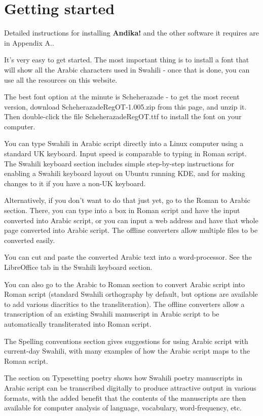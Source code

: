 \documentclass[a4paper,10pt, oneside]{book}
\begin{document}
\chapter{Getting started}

Detailed instructions for installing \textbf{Andika!} and the other software it requires are in Appendix A..

It's very easy to get started. The most important thing is to install a font that will show all the Arabic characters used in Swahili - once that is done, you can use all the resources on this website.

The best font option at the minute is Scheherazade - to get the most recent version, download ScheherazadeRegOT-1.005.zip from this page, and unzip it. Then double-click the file ScheherazadeRegOT.ttf to install the font on your computer.

You can type Swahili in Arabic script directly into a Linux computer using a standard UK keyboard. Input speed is comparable to typing in Roman script. The Swahili keyboard section includes simple step-by-step instructions for enabling a Swahili keyboard layout on Ubuntu running KDE, and for making changes to it if you have a non-UK keyboard.

Alternatively, if you don't want to do that just yet, go to the Roman to Arabic section. There, you can type into a box in Roman script and have the input converted into Arabic script, or you can input a web address and have that whole page converted into Arabic script. The offline converters allow multiple files to be converted easily.

You can cut and paste the converted Arabic text into a word-processor. See the LibreOffice tab in the Swahili keyboard section.

You can also go to the Arabic to Roman section to convert Arabic script into Roman script (standard Swahili orthography by default, but options are available to add various diacritics to the transliteration). The offline converters allow a transcription of an existing Swahili manuscript in Arabic script to be automatically transliterated into Roman script.

The Spelling conventions section gives suggestions for using Arabic script with current-day Swahili, with many examples of how the Arabic script maps to the Roman script.

The section on Typesetting poetry shows how Swahili poetry manuscripts in Arabic script can be transcribed digitally to produce attractive output in various formats, with the added benefit that the contents of the manuscripts are then available for computer analysis of language, vocabulary, word-frequency, etc. 
\end{document}
